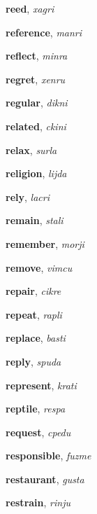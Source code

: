 \documentclass[12pt]{book}
\begin{document}
\begin{description}
\item[ ] \textbf{reed}, \textit{xagri}

\item[ ] \textbf{reference}, \textit{manri}

\item[ ] \textbf{reflect}, \textit{minra}

\item[ ] \textbf{regret}, \textit{xenru}

\item[ ] \textbf{regular}, \textit{dikni}

\item[ ] \textbf{related}, \textit{ckini}

\item[ ] \textbf{relax}, \textit{surla}

\item[ ] \textbf{religion}, \textit{lijda}

\item[ ] \textbf{rely}, \textit{lacri}

\item[ ] \textbf{remain}, \textit{stali}

\item[ ] \textbf{remember}, \textit{morji}

\item[ ] \textbf{remove}, \textit{vimcu}

\item[ ] \textbf{repair}, \textit{cikre}

\item[ ] \textbf{repeat}, \textit{rapli}

\item[ ] \textbf{replace}, \textit{basti}

\item[ ] \textbf{reply}, \textit{spuda}

\item[ ] \textbf{represent}, \textit{krati}

\item[ ] \textbf{reptile}, \textit{respa}

\item[ ] \textbf{request}, \textit{cpedu}

\item[ ] \textbf{responsible}, \textit{fuzme}

\item[ ] \textbf{restaurant}, \textit{gusta}

\item[ ] \textbf{restrain}, \textit{rinju}


\end{description}
\end{document}
